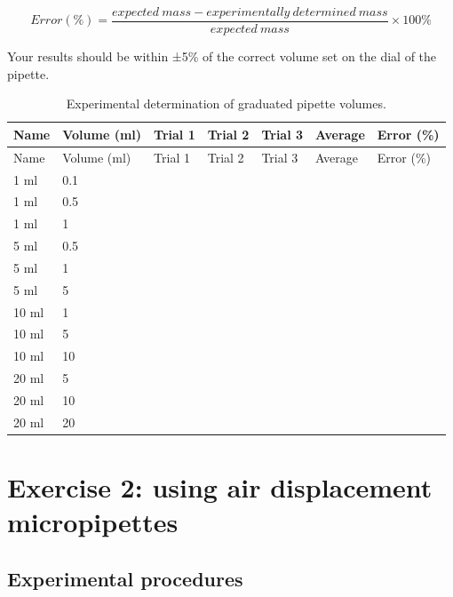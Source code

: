 \documentclass[]{book}
\theoremstyle{definition}
\theoremstyle{definition}
\theoremstyle{definition}
\theoremstyle{remark}
\begin{document}
\[ Error (\%) = \frac{expected\ mass - experimentally\ determined\ mass}{expected\ mass} \times 100\% \]

Your results should be within ±5\% of the correct volume set on the dial
of the pipette.

\begin{longtable}[]{@{}lllllll@{}}
\caption{\label{tab:graduated} Experimental determination of graduated
pipette volumes.}\tabularnewline
\toprule
Name & Volume (ml) & Trial 1 & Trial 2 & Trial 3 & Average & Error
(\%)\tabularnewline
\midrule
\endfirsthead
\toprule
Name & Volume (ml) & Trial 1 & Trial 2 & Trial 3 & Average & Error
(\%)\tabularnewline
\midrule
\endhead
1 ml & 0.1 & & & & &\tabularnewline
1 ml & 0.5 & & & & &\tabularnewline
1 ml & 1 & & & & &\tabularnewline
5 ml & 0.5 & & & & &\tabularnewline
5 ml & 1 & & & & &\tabularnewline
5 ml & 5 & & & & &\tabularnewline
10 ml & 1 & & & & &\tabularnewline
10 ml & 5 & & & & &\tabularnewline
10 ml & 10 & & & & &\tabularnewline
20 ml & 5 & & & & &\tabularnewline
20 ml & 10 & & & & &\tabularnewline
20 ml & 20 & & & & &\tabularnewline
\bottomrule
\end{longtable}

\section{Exercise 2: using air displacement
micropipettes}\label{exercise-2-using-air-displacement-micropipettes}

\subsection{Experimental procedures}\label{experimental-procedures-6}
\end{document}
